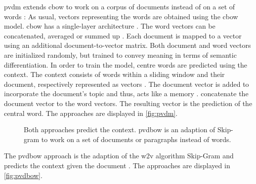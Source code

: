 \ac{pvdm} extends \ac{cbow} to work on a corpus of documents instead of on a set of words \cite{clusteringDocs2020}:
As usual, vectors representing the words are obtained using the \ac{cbow} model.
\ac{cbow} has a single-layer architecture \cite{glove2014}. %
The word vectors can be concatenated, averaged or summed up \cite{SentRep2014}.
Each document is mapped to a vector using an additional document-to-vector matrix.
Both document and word vectors are initialized randomly, but trained to convey meaning in terms of semantic differentiation.
In order to train the model, centre words are predicted using the context.
The context consists of words within a sliding window and their document, respectively represented as vectors \cite{SentRep2014}.
The document vector is added to incorporate the document's topic and thus, acts like a memory \cite{SentRep2014, Top2Vec2020}.
\citeauthor{SentRep2014} concatenate the document vector to the word vectors.
The resulting vector is the prediction of the central word.
The approaches are displayed in \autoref{fig:pvdm}.


\begin{figure}%
    \centering
    \qquad
    \caption[Two \acs*{pvdbow} architectures]{Both approaches predict the context.
    \acs*{pvdbow} is an adaption of Skip-gram to work on a set of documents or paragraphs instead of words.
    }%
    \label{fig:pvdbow}%
\end{figure}
The \ac{pvdbow} approach is the adaption of the \ac{w2v} algorithm Skip-Gram and predicts the context 
given the document \cite{SentRep2014}.
The approaches are displayed in \autoref{fig:pvdbow}.


